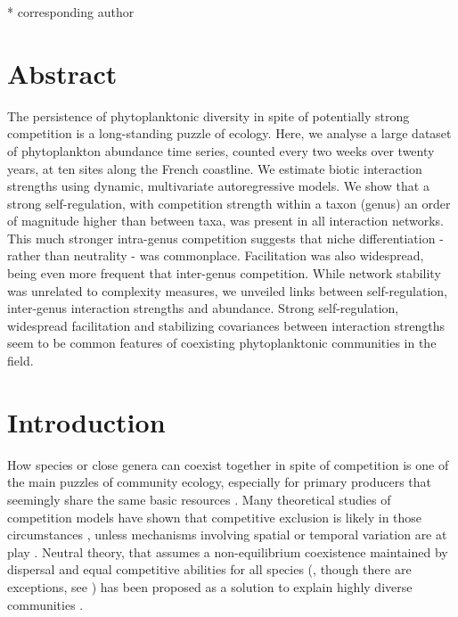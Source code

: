\documentclass[10pt]{article}
\begin{document}
\bigskip{}
{*} corresponding author

\newpage{}

\section*{Abstract}

The persistence of phytoplanktonic diversity in spite of potentially
strong competition is a long-standing puzzle of ecology. Here, we
analyse a large dataset of phytoplankton abundance time series, counted
every two weeks over twenty years, at ten sites along the French coastline.
We estimate biotic interaction strengths using dynamic, multivariate
autoregressive models. We show that a strong self-regulation, with
competition strength within a taxon (genus) an order of magnitude
higher than between taxa, was present in all interaction networks.
This much stronger intra-genus competition suggests that niche differentiation
- rather than neutrality - was commonplace. Facilitation was also
widespread, being even more frequent that inter-genus competition.
While network stability was unrelated to complexity measures, we unveiled
links between self-regulation, inter-genus interaction strengths and
abundance. Strong self-regulation, widespread facilitation and stabilizing
covariances between interaction strengths seem to be common features
of coexisting phytoplanktonic communities in the field. %

\linenumbers

\doublespacing \newpage{}

\section*{Introduction}

How species or close genera can coexist together in spite of competition
is one of the main puzzles of community ecology, especially for primary
producers that seemingly share the same basic resources \citep{hutchinson_paradox_1961}.
Many theoretical studies of competition models have shown that competitive
exclusion is likely in those circumstances \citep{armstrong1980competitive,chesson_updates_2018},
unless mechanisms involving spatial or temporal variation are at play
\citep{armstrong1976coexistence,chesson_roles_1997,huisman_biological_2001,li_effects_2016}.
Neutral theory, that assumes a non-equilibrium coexistence maintained
by dispersal and equal competitive abilities for all species (\citealt{hubbell_unified_2001},
though there are exceptions, see \citealt{volkov_neutral_2003,volkov_patterns_2007})
has been proposed as a solution to explain highly diverse communities
\citep{hubbell_unified_2001,rosindell2011unified}.
\end{document}
